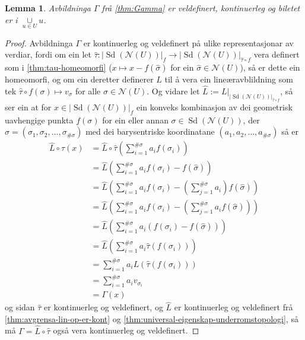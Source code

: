 \documentclass[a4paper, 12pt, norsk]{article}
\theoremstyle{plain}
\newtheorem{lemma}[theorem]{Lemma}
\theoremstyle{definition}
\newcommand{\Nc}{\mathcal{N}}
\newcommand{\union}{ \mathop{\cup}\limits }
\newcommand{\gr}[1]{ \lvert #1 \rvert } %
\newcommand{\tuple}[1]{ \left( #1 \right) } %
\DeclareMathOperator{\Sd}{Sd} %
\begin{document}
\begin{lemma} \label{thm:Gamma-eigenskapar}
	Avbildninga \( \Gamma \) frå \autoref{thm:Gamma} er veldefinert, kontinuerleg og biletet er i \( \union_{u\in U} u \).
\end{lemma}

\begin{proof}
	Avbildninga \( \Gamma \) er kontinuerleg og veldefinert på ulike representasjonar av verdiar, fordi om ein let \( \hat{\tau} : \gr{\Sd(\Nc(U))}_f \to \gr{\Sd(\Nc(U))}_{\hat{\tau} \circ f} \) vera definert som i \autoref{thm:tau-homeomorfi} (\( x \mapsto x - f(\hat{\sigma}) \) for ein \( \hat{\sigma} \in \Nc(U) \)), så er dette ein homeomorfi, og om ein deretter definerer \( L \) til å vera ein lineæravblildning som tek \( \hat{\tau} \circ f (\sigma) \mapsto v_{\sigma} \) for alle \( \sigma \in \Nc(U) \). Og vidare let \( \hat{L} := L|_{\gr{\Sd(\Nc(U))}_{\hat{\tau}\circ f}} \), så ser ein at for \( x \in \gr{\Sd(\Nc(U))}_f \) ein konveks kombinasjon av dei geometrisk uavhengige punkta \( f(\sigma) \) for ein eller annan \( \sigma \in \Sd(\Nc(U)) \), der \( \sigma = \tuple{\sigma_1, \sigma_2, \dots, \sigma_{\#\sigma}} \) med dei barysentriske koordinatane \( \tuple{a_1, a_2, \dots, a_{\#\sigma}} \) så er
	\begin{align*}
		\hat{L} \circ \hat{\tau} (x) &= \hat{L} \circ \hat{\tau} \tuple{\sum_{i=1}^{\#\sigma}a_i f(\sigma_i)} \\
		&= \hat{L} \tuple{\sum_{i=1}^{\#\sigma}a_i f(\sigma_i)-f(\hat{\sigma})} \\
		&= \hat{L} \tuple{\sum_{i=1}^{\#\sigma}a_i f(\sigma_i)-\tuple{\sum_{j=1}^{\#\sigma}a_i}f(\hat{\sigma})} \\
		&= \hat{L} \tuple{\sum_{i=1}^{\#\sigma}a_i f(\sigma_i)-\tuple{\sum_{j=1}^{\#\sigma}a_if(\hat{\sigma})}} \\
		&= \hat{L} \tuple{\sum_{i=1}^{\#\sigma}a_i\tuple{f(\sigma_i)-f(\hat{\sigma})}} \\
		&= \hat{L} \tuple{\sum_{i=1}^{\#\sigma}a_i\hat{\tau}\tuple{f(\sigma_i)}} \\
		&= \sum_{i=1}^{\#\sigma}a_iL\tuple{\hat{\tau}\tuple{f(\sigma_i)}} \\
		&= \sum_{i=1}^{\#\sigma}a_i v_{\sigma_i} \\
		&= \Gamma(x)
	\end{align*}
	og sidan \( \hat{\tau} \) er kontinuerleg og veldefinert, og \( \hat{L} \) er kontinuerleg og veldefinert frå \autoref{thm:avgrensa-lin-op-er-kont} og \autoref{thm:universal-eigenskap-underromstopologi}, så må \( \Gamma = \hat{L}\circ\hat{\tau} \) også vera kontinuerleg og veldefinert.


\end{proof}
\end{document}
